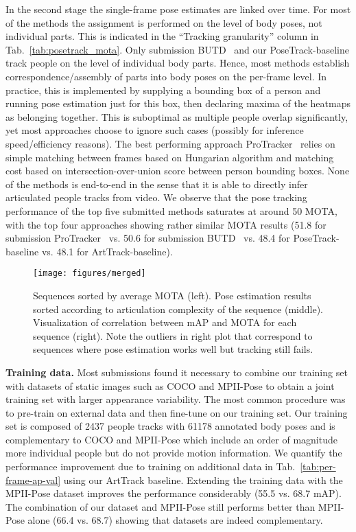 \documentclass[10pt,twocolumn,letterpaper]{article}
\newcommand{\myparagraph}[1]{\vspace{0.1em}\noindent\textbf{#1}}
\newcommand{\ProTracker}{ProTracker~\cite{ProTracker} \xspace}
\newcommand{\BUTD}{BUTD~\cite{BUDT}\xspace}
\begin{document}
In the second stage the single-frame pose estimates are linked over time.  For
most of the methods the assignment is performed on the level of body poses, not
individual parts. This is indicated in the ``Tracking granularity'' column in
Tab.~\ref{tab:posetrack_mota}. Only submission \BUTD and our PoseTrack-baseline track people
on the level of individual body parts. Hence, most methods establish
correspondence/assembly of parts into body poses on the per-frame level. In
practice, this is implemented by supplying a bounding box of a person and running
pose estimation just for this box, then declaring maxima of the heatmaps as
belonging together. This is suboptimal as multiple people overlap significantly,
yet most approaches choose to ignore such cases (possibly for inference
speed/efficiency reasons). The best performing approach \ProTracker relies on
simple matching between frames based on Hungarian algorithm and matching cost
based on intersection-over-union score between person bounding boxes. None of
the methods is end-to-end in the sense that it is able to directly infer
articulated people tracks from video. We observe that the pose tracking
performance of the top five submitted methods saturates at around 50 MOTA, with
the top four approaches showing rather similar MOTA results (51.8 for
submission \ProTracker vs. 50.6 for submission \BUTD vs. 48.4 for
PoseTrack-baseline vs. 48.1 for ArtTrack-baseline). 

\begin{figure*}[!tbp]
\texttt{[image: figures/merged]}
  \vspace{-2mm}
  \caption{Sequences sorted by average MOTA (left). Pose estimation results sorted
    according to articulation complexity of the sequence (middle). Visualization
    of correlation between mAP and MOTA for each sequence (right). Note the outliers in
    right plot that correspond to sequences where pose estimation works well but
  tracking still fails. \vspace{-4mm}}
    \label{fig:mota:all_methods}
\end{figure*}
 
\myparagraph{Training data.} Most submissions found it necessary to combine our
training set with datasets of static images such as COCO and MPII-Pose to obtain
a joint training set with larger appearance variability. The most common
procedure was to pre-train on external data and then fine-tune on our
training set. Our training set is composed of \num{2437} people tracks with \num{61178}
annotated body poses and is complementary to COCO and MPII-Pose which include an
order of magnitude more individual people but do not provide motion
information. We quantify the performance improvement due to training on
additional data in Tab.~\ref{tab:per-frame-ap-val} using our ArtTrack baseline.
Extending the training data with the MPII-Pose dataset improves the performance
considerably (55.5 vs. 68.7 mAP). The combination of our dataset and MPII-Pose
still performs better than MPII-Pose alone (66.4 vs. 68.7) showing that datasets
are indeed complementary.
\end{document}
